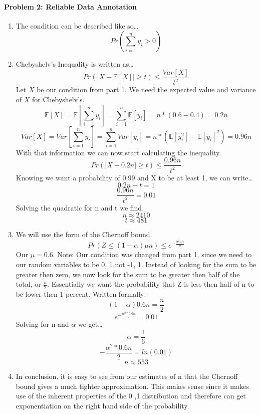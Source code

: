 \documentclass[12pt]{article}
\begin{document}
    \paragraph{Problem 2: Reliable Data Annotation}
    \begin{enumerate}
        \item The condition can be described like so\dots
        \[Pr(\sum_{i=1}^{n} y_i > 0)\]
        \item Chebyshelv's Inequality is written as\dots
        \[Pr(|X-\mathbb{E}[X]| \ge t) \le \frac{Var[X]}{t^2}\]
        Let \(X\) be our condition from part 1. We need the expected value and 
        variance of \(X\) for Chebyshelv's.
        \[
            \mathbb{E}[X] 
            = \mathbb{E} \left[ \sum_{i=1}^{n} y_i \right] 
            = \sum_{i=1}^{n} \mathbb{E} [y_i]
            = n * (0.6 - 0.4) = 0.2n
        \]
        \[
            Var[X] 
            = Var \left[ \sum_{i=1}^{n} y_i \right]
            = \sum_{i=1}^{n} Var[y_i]
            = n * (\mathbb{E}[y_i^2] - \mathbb{E}[y_i]^2)
            = 0.96n
        \]
        With that information we can now start calculating the inequality.
        \[
            Pr(|X - 0.2n| \ge t) \le \frac{0.96n}{t^2}
        \]
        Knowing we want a probability of 0.99 and X to be at least 1, we can write\dots
            \[0.2n - t = 1 \]
            \[\frac{0.96n}{t^2} = 0.01\]
        Solving the quadratic for n and t we find.
        \[ n \approx 2410 \]
        \[ t \approx 481 \]
        
        \item We will use the form of the Chernoff bound.
        \[
            Pr(Z \le (1 - \alpha)\mu n) \le e^{-\frac{\alpha^2 \mu n}{2}}    
        \]
        Our \(\mu = 0.6\). Note: Our condition was changed from part 1, since 
        we need to our random variables to be {0, 1} not {-1, 1}. Instead of looking for
        the sum to be greater then zero, we now look for the sum to be greater then half of 
        the total, or \(\frac{n}{2}\).
        Essentially we want the probability that Z is less then
        half of n to be lower then 1 percent. Written formally:
        \[ (1 - \alpha) 0.6n = \frac{n}{2}\]
        \[ e^{-\frac{\alpha^2 * 0.6n}{2}} = 0.01\]
        Solving for n and \(\alpha\) we get\dots
        \[
            \alpha = \frac{1}{6}
        \]
        \[
            -\frac{\alpha^2 * 0.6n}{2} = ln(0.01)
        \]
        \[
            n \approx 553
        \]
        \item In conclusion, it is easy to see from our estimates of n that the Chernoff bound gives a much 
        tighter approximation. This makes sense since it makes use of the inherent properties of the {0 ,1}
        distribution and therefore can get exponentiation on the right hand side of the probability.
    \end{enumerate}
\end{document}
